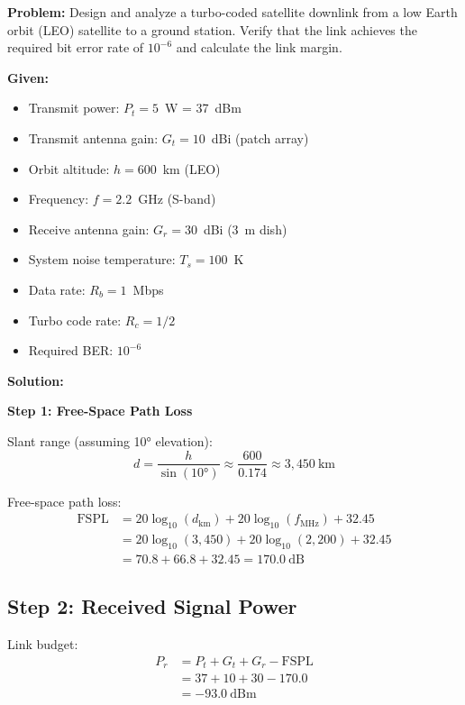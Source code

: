 \textbf{Problem:} Design and analyze a turbo-coded satellite downlink from a low Earth orbit (LEO) satellite to a ground station. Verify that the link achieves the required bit error rate of $10^{-6}$ and calculate the link margin.

\textbf{Given:}

\begin{itemize}
\item Transmit power: $P_t = 5$~W = 37~dBm
\item Transmit antenna gain: $G_t = 10$~dBi (patch array)
\item Orbit altitude: $h = 600$~km (LEO)
\item Frequency: $f = 2.2$~GHz (S-band)
\item Receive antenna gain: $G_r = 30$~dBi (3~m dish)
\item System noise temperature: $T_s = 100$~K
\item Data rate: $R_b = 1$~Mbps
\item Turbo code rate: $R_c = 1/2$
\item Required BER: $10^{-6}$
\end{itemize}

\textbf{Solution:}

\textbf{Step 1: Free-Space Path Loss}

Slant range (assuming 10° elevation):
\begin{equation}
d = \frac{h}{\sin(10°)} \approx \frac{600}{0.174} \approx 3{,}450~\text{km}
\end{equation}

Free-space path loss:
\begin{equation}
\begin{aligned}
\text{FSPL} &= 20\log_{10}(d_{\text{km}}) + 20\log_{10}(f_{\text{MHz}}) + 32.45 \\
&= 20\log_{10}(3{,}450) + 20\log_{10}(2{,}200) + 32.45 \\
&= 70.8 + 66.8 + 32.45 = 170.0~\text{dB}
\end{aligned}
\end{equation}

\subsection*{Step 2: Received Signal Power}

Link budget:
\begin{equation}
\begin{aligned}
P_r &= P_t + G_t + G_r - \text{FSPL} \\
&= 37 + 10 + 30 - 170.0 \\
&= -93.0~\text{dBm}
\end{aligned}
\end{equation}

